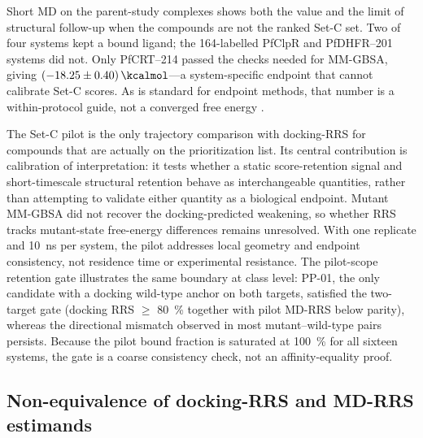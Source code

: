 \documentclass[journal=jcisd8,manuscript=article,layout=traditional]{achemso}
\begin{document}
Short MD on the parent-study complexes shows both the value and the limit of structural follow-up when the compounds are not the ranked Set-C set. Two of four systems kept a bound ligand; the 164-labelled PfClpR and PfDHFR--201 systems did not. Only PfCRT--214 passed the checks needed for MM-GBSA, giving $\qty{-18.25 \pm 0.40}{\kcalmol}$---a system-specific endpoint that cannot calibrate Set-C scores. As is standard for endpoint methods, that number is a within-protocol guide, not a converged free energy \citep{wang2019_mmgbsa,gmx_mmpbsa_2021}.

The Set-C pilot is the only trajectory comparison with docking-RRS for compounds that are actually on the prioritization list. Its central contribution is calibration of interpretation: it tests whether a static score-retention signal and short-timescale structural retention behave as interchangeable quantities, rather than attempting to validate either quantity as a biological endpoint. Mutant MM-GBSA did not recover the docking-predicted weakening, so whether RRS tracks mutant-state free-energy differences remains unresolved. With one replicate and 10~ns per system, the pilot addresses local geometry and endpoint consistency, not residence time or experimental resistance. The pilot-scope retention gate illustrates the same boundary at class level: PP-01, the only candidate with a docking wild-type anchor on both targets, satisfied the two-target gate (docking RRS $\geq$ \qty{80}{\percent} together with pilot MD-RRS below parity), whereas the directional mismatch observed in most mutant--wild-type pairs persists. Because the pilot bound fraction is saturated at \qty{100}{\percent} for all sixteen systems, the gate is a coarse consistency check, not an affinity-equality proof.

\subsection{Non-equivalence of docking-RRS and MD-RRS estimands}
\end{document}
